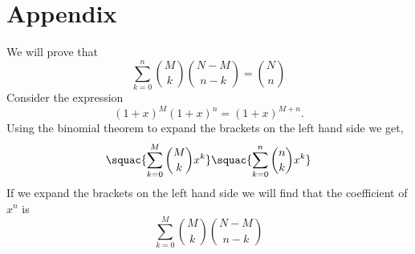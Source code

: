 \section{Appendix} \label{appendix B}
We will prove that
\[
\sum_{k=0}^n \binom{M}{k}\binom{N-M}{n-k} = \binom{N}{n} \tag{$\star$}
\]
Consider the expression
\[
(1+x)^M(1+x)^n = (1+x)^{M+n}.
\]
Using the binomial theorem to expand the brackets on the left hand side we get,
\[
\squac{\sum_{k=0}^M \binom{M}{k}x^k}\squac{\sum_{k=0}^n \binom{n}{k}x^k}
\]
If we expand the brackets on the left hand side we will find that the coefficient of $x^n$ is
\[
\sum_{k=0}^M\binom{M}{k}\binom{N-M}{n-k}
\]
